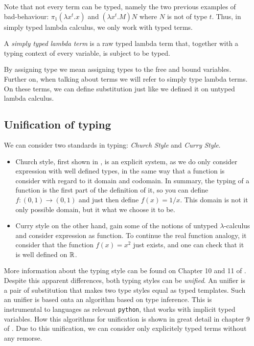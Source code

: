Note that not every term can be typed, namely the two previous examples of bad-behaviour: $\pi_1(\lambda x^t. x)$ and $(\lambda x^t.M)N$ where $N$ is not of type $t$. Thus, in simply typed lambda calculus, we only work with typed terms.

\begin{definition}
  A \emph{simply typed lambda term} is a raw typed lambda term that, together with a typing context of every variable, is subject to be typed.
\end{definition}

By assigning type we mean assigning types to the free and bound variables. Further on, when talking about terms we will refer to simply type lambda terms. On these terms, we can define substitution just like we defined it on untyped lambda calculus.

\subsection{Unification of typing}

We can consider two standards in typing: \emph{Church Style} and \emph{Curry Style}.
\begin{itemize}
\item Church style,  first shown in \cite{church1940formulation}, is an explicit system, as we do only consider expression with well defined types, in the same way that a function is consider with regard to it domain and codomain. In summary, the typing of a function is the first part of the definition of it, so you can define $f:(0,1)\to (0,1)$ and just then define $f(x)=1/x$. This domain is not it only possible domain, but it what we choose it to be. 
\item Curry style on the other hand, gain some of the notions of untyped $\lambda$-calculus and consider expression as function. To continue the real function analogy, it consider that the function $f(x)=x^2$ just exists, and one can check that it is well defined on $\mathbb{R}$. \\
\end{itemize}
More information about the typing style can be found on Chapter 10 and 11 of \cite{hindley2008lambda}. \\

Despite this apparent differences, both typing styles can be \emph{unified}. An unifier is a pair of substitution that makes two type styles equal as typed templates. Such an unifier is based onta an algorithm based on type inference. This is instrumental to languages  as relevant \texttt{python}, that works with implicit typed variables. How this algorithms for unification is shown in great detail in chapter 9  of \cite{selinger2008lecture}. Due to this unification, we can consider only explicitely typed terms without any remorse.

